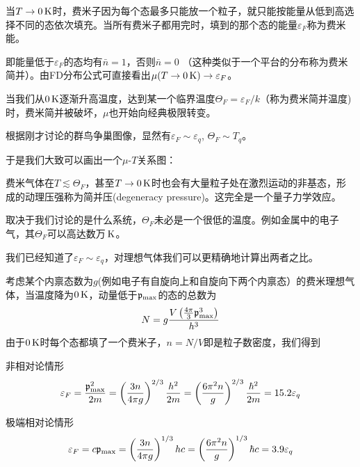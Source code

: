 \documentclass[CJK]{beamer}
\begin{document}
\begin{frame}
\bch
{}
{\small
当$T \rightarrow 0\,\mathrm{K}$时，费米子因为每个态最多只能放一个粒子，就只能按能量从低到高选择不同的态依次填充。当所有费米子都用完时，填到的那个态的能量$\varepsilon_F$称为{\blue 费米能}。

即能量低于$\varepsilon_F$的态均有$\bar{n} = 1$，否则$\bar{n} = 0$ （这种类似于一个平台的分布称为费米简并）。由FD分布公式可直接看出$\mu(T\rightarrow 0\,\mathrm{K}) \rightarrow \varepsilon_F$。


当我们从$0\,\mathrm{K}$逐渐升高温度，达到某一个临界温度$\Theta_F = \varepsilon_F/k $（称为{\blue 费米简并温度})时，费米简并被破坏，$\mu$也开始向经典极限转变。

根据刚才讨论的群鸟争巢图像，显然有$\varepsilon_F \sim \varepsilon_q$,  $\Theta_F \sim T_q$。

于是我们大致可以画出一个$\mu$-$T$关系图：}
\emini
{}
\emini

\ech
\end{frame}


\begin{frame}
\bch


费米气体在$T\lesssim \Theta_F$，甚至$T\rightarrow 0\,\mathrm{K}$时也会有大量粒子处在激烈运动的非基态，形成的动理压强称为{\blue 简并压}(degeneracy pressure)。这完全是一个量子力学效应。

\skipline

取决于我们讨论的是什么系统，$\Theta_F$未必是一个很低的温度。例如金属中的电子气，其$\Theta_F$可以高达数万$\,\mathrm{K}$。
\ech
\end{frame}



\begin{frame}
\bch
{\small
我们已经知道了$\varepsilon_F\sim \varepsilon_q$，对理想气体我们可以更精确地计算出两者之比。

考虑某个内禀态数为$g$(例如电子有自旋向上和自旋向下两个内禀态）的费米理想气体，当温度降为$0\,\mathrm{K}$，动量低于${\mathfrak{p}}_{\max}$的态的总数为
$$ N =  g \frac{V \left(\frac{4\pi}{3} {\mathfrak{p}}_{\max}^3\right)}{h^3} $$
由于$0\,\mathrm{K}$时每个态都填了一个费米子，$n = N/V$即是粒子数密度，我们得到

非相对论情形
$$\varepsilon_F = \frac{{\mathfrak{p}}_{\max}^2}{2m} =  \left(\frac{3n}{4\pi g}\right)^{2/3} \frac{h^2}{2m} = \left(\frac{6\pi^2 n}{ g}\right)^{2/3} \frac{\hbar^2}{2m} = 15.2 \varepsilon_q$$

极端相对论情形
$$\varepsilon_F = c{\mathfrak{p}}_{\max} =  \left(\frac{3n}{4\pi g}\right)^{1/3} hc = \left(\frac{6\pi^2 n}{ g}\right)^{1/3} \hbar c = 3.9 \varepsilon_q$$
}
\ech
\end{frame}
\end{document}
